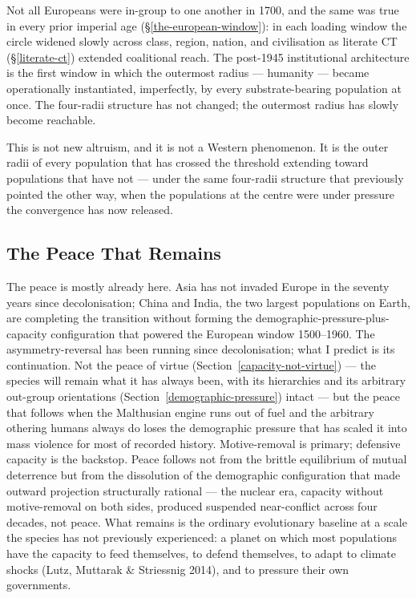 \documentclass[12pt,letterpaper]{article}
\begin{document}
Not all Europeans were in-group
to one another in 1700, and the same was true in every prior imperial
age (§\ref{the-european-window}): in each loading window the circle
widened slowly across class, region, nation, and civilisation as
literate CT (§\ref{literate-ct}) extended coalitional reach. The
post-1945 institutional architecture is the first window in which
the outermost radius --- humanity --- became operationally
instantiated, imperfectly, by every substrate-bearing population at
once. The four-radii structure has not changed; the outermost radius
has slowly become reachable.

This is not new altruism, and it is not
a Western phenomenon. It is the outer radii of every population that
has crossed the threshold extending toward populations that have
not --- under the same four-radii structure that previously pointed
the other way, when the populations at the centre were under pressure
the convergence has now released.

\subsection{The Peace That Remains}\label{the-peace-that-remains}

The peace is mostly already here. Asia has not invaded Europe in the
seventy years since decolonisation; China and India, the two largest
populations on Earth, are completing the transition without forming
the demographic-pressure-plus-capacity configuration that powered the
European window 1500--1960. The asymmetry-reversal has been running
since decolonisation; what I predict is its continuation. Not the
peace of virtue (Section~\ref{capacity-not-virtue}) --- the species
will remain what it has always been, with its hierarchies and its
arbitrary out-group orientations (Section~\ref{demographic-pressure})
intact --- but the peace that follows when the Malthusian engine runs
out of fuel and the arbitrary othering humans always do loses the
demographic pressure that has scaled it into mass violence for most
of recorded history. Motive-removal is primary;
defensive capacity is the backstop. Peace follows not from the
brittle equilibrium of mutual deterrence but from the dissolution of
the demographic configuration that made outward projection
structurally rational --- the nuclear era, capacity without
motive-removal on both sides, produced suspended near-conflict across
four decades, not peace. What remains is the ordinary evolutionary
baseline at a scale the species has not previously experienced: a
planet on which most populations have the capacity to feed
themselves, to defend themselves, to adapt to climate shocks
(Lutz, Muttarak \& Striessnig 2014), and to pressure their own
governments.
\end{document}
